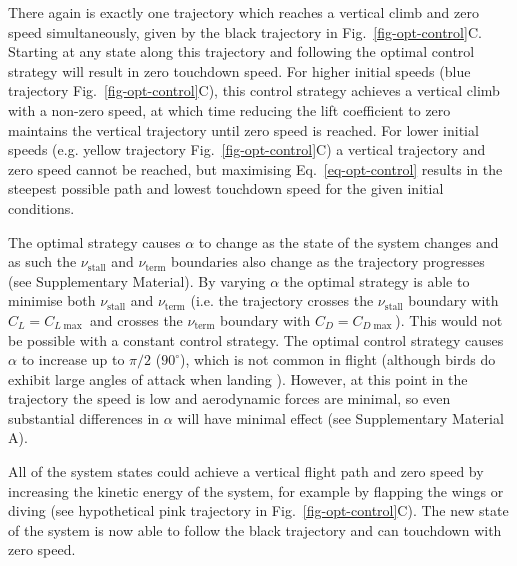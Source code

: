 There again is exactly one trajectory which reaches a vertical climb and zero speed simultaneously, given by the black trajectory in Fig.~\ref{fig-opt-control}C. Starting at any state along this trajectory and following the optimal control strategy will result in zero touchdown speed. For higher initial speeds (blue trajectory Fig.~\ref{fig-opt-control}C), this control strategy achieves a vertical climb with a non-zero speed, at which time reducing the lift coefficient to zero maintains the vertical trajectory until zero speed is reached. For lower initial speeds (e.g. yellow trajectory Fig.~\ref{fig-opt-control}C) a vertical trajectory and zero speed cannot be reached, but maximising Eq.~\eqref{eq-opt-control} results in the steepest possible path and lowest touchdown speed for the given initial conditions.

The optimal strategy causes $\alpha$ to change as the state of the system changes and as such the $\nu_{\mathrm{stall}}$ and $\nu_{\mathrm{term}}$ boundaries also change as the trajectory progresses (see Supplementary Material). By varying $\alpha$ the optimal strategy is able to minimise both $\nu_{\mathrm{stall}}$ and $\nu_{\mathrm{term}}$ (i.e. the trajectory crosses the $\nu_{\mathrm{stall}}$ boundary with $C_L=C_{L\max}$ and crosses the $\nu_{\mathrm{term}}$ boundary with $C_D=C_{D\max}$). This would not be possible with a constant control strategy. The optimal control strategy causes $\alpha$ to increase up to $\pi/2$ ($90^\circ$), which is not common in flight (although birds do exhibit large angles of attack when landing \cite{carruthersAutomaticAeroelasticDevices2007}). However, at this point in the trajectory the speed is low and aerodynamic forces are minimal, so even substantial differences in $\alpha$ will have minimal effect (see Supplementary Material A).

All of the system states could achieve a vertical flight path and zero speed by increasing the kinetic energy of the system, for example by flapping the wings or diving (see hypothetical pink trajectory in Fig.~\ref{fig-opt-control}C). The new state of the system is now able to follow the black trajectory and can touchdown with zero speed.

